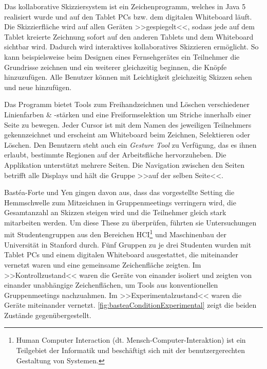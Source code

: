 \medskip Das kollaborative Skizziersystem ist ein Zeichenprogramm, welches in Java 5 realisiert wurde und auf den Tablet PCs bzw. dem digitalen Whiteboard läuft. Die Skizzierfläche wird auf allen Geräten >>gespiegelt<<, sodass jede auf dem Tablet kreierte Zeichnung sofort auf den anderen Tablets und dem Whiteboard sichtbar wird. Dadurch wird interaktives kollaboratives Skizzieren ermöglicht. So kann beispielsweise beim Designen eines Fernsehgerätes ein Teilnehmer die Grundrisse zeichnen und ein weiterer gleichzeitig beginnen, die Knöpfe hinzuzufügen. Alle Benutzer können mit Leichtigkeit gleichzeitig Skizzen sehen und neue hinzufügen. 

\medskip Das Programm bietet Tools zum Freihandzeichnen und Löschen verschiedener Linienfarben \& -stärken und eine Freiformselektion um Striche innerhalb einer Seite zu bewegen. Jeder Cursor ist mit dem Namen des jeweiligen Teilnehmers gekennzeichnet und erscheint am Whiteboard beim Zeichnen, Selektieren oder Löschen. Den Benutzern steht auch ein \emph{Gesture Tool} zu Verfügung, das es ihnen erlaubt, bestimmte Regionen auf der Arbeitsfläche hervorzuheben. Die Applikation unterstützt mehrere Seiten. Die Navigation zwischen den Seiten betrifft alle Displays und hält die Gruppe >>auf der selben Seite<<.

\medskip Bastéa-Forte und Yen gingen davon aus, dass das vorgestellte Setting die Hemmschwelle zum Mitzeichnen in Gruppenmeetings verringern wird, die Gesamtanzahl an Skizzen steigen wird und die Teilnehmer gleich stark mitarbeiten werden. Um diese These zu überprüfen, führten sie Untersuchungen mit Studentengruppen aus den Bereichen \ac{HCI}\footnote{Human Computer Interaction (dt. Mensch-Computer-Interaktion) ist ein Teilgebiet der Informatik und beschäftigt sich mit der benutzergerechten Gestaltung von Systemen.} und Maschinenbau der Universität in Stanford durch. Fünf Gruppen zu je drei Studenten wurden mit Tablet PCs und einem digitalen Whiteboard ausgestattet, die miteinander vernetzt waren und eine gemeinsame Zeichenfläche zeigten. Im >>Kontrollzustand<< waren die Geräte von einander isoliert und zeigten von einander unabhängige Zeichenflächen, um Tools aus konventionellen Gruppenmeetings nachzuahmen. Im >>Experimentalzustand<< waren die Geräte miteinander vernetzt. \autoref{fig:basteaConditionExperimental} zeigt die beiden Zustände gegenübergestellt.

